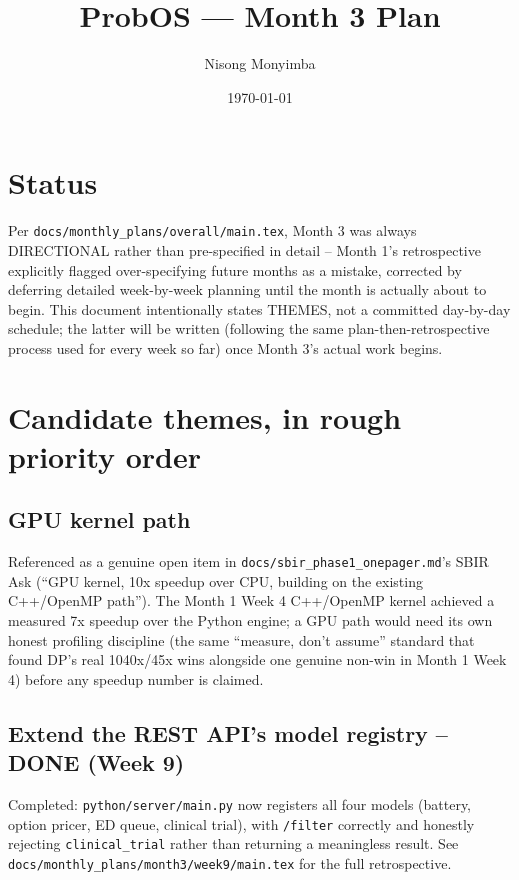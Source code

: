 \documentclass[11pt]{article}
\title{ProbOS --- Month 3 Plan}
\author{Nisong Monyimba}
\date{\today}
\begin{document}
\maketitle

\section*{Status}
Per \texttt{docs/monthly\_plans/overall/main.tex}, Month 3 was always
DIRECTIONAL rather than pre-specified in detail -- Month 1's
retrospective explicitly flagged over-specifying future months as a
mistake, corrected by deferring detailed week-by-week planning until
the month is actually about to begin. This document intentionally
states THEMES, not a committed day-by-day schedule; the latter will
be written (following the same plan-then-retrospective process used
for every week so far) once Month 3's actual work begins.

\section*{Candidate themes, in rough priority order}

\subsection*{GPU kernel path}
Referenced as a genuine open item in
\texttt{docs/sbir\_phase1\_onepager.md}'s SBIR Ask (``GPU kernel, 10x
speedup over CPU, building on the existing C++/OpenMP path''). The
Month 1 Week 4 C++/OpenMP kernel achieved a measured 7x speedup over
the Python engine; a GPU path would need its own honest profiling
discipline (the same ``measure, don't assume'' standard that found
DP's real 1040x/45x wins alongside one genuine non-win in Month 1
Week 4) before any speedup number is claimed.

\subsection*{Extend the REST API's model registry -- DONE (Week 9)}
Completed: \texttt{python/server/main.py} now registers all four
models (battery, option pricer, ED queue, clinical trial), with
\texttt{/filter} correctly and honestly rejecting \texttt{clinical\_trial}
rather than returning a meaningless result. See
\texttt{docs/monthly\_plans/month3/week9/main.tex} for the full
retrospective.
\end{document}
